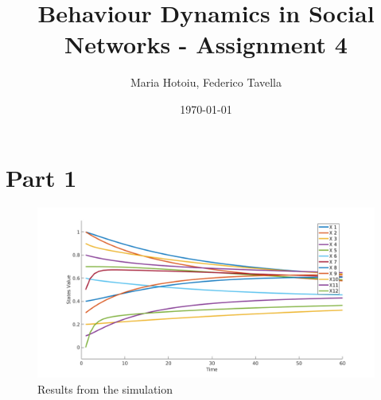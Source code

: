 \documentclass[a4paper]{article}
\title{Behaviour Dynamics in Social Networks - Assignment 4}
\author{Maria Hotoiu, Federico Tavella}
\date{\today}
\begin{document}
\maketitle

\begin{abstract}

\end{abstract}

\section{Part 1}

\begin{figure}[!htpb]
\center
\includegraphics[width=1.2\textwidth]{res/img/part1}
\caption{Results from the simulation}
\label{fig:part1}
\end{figure}
\end{document}
